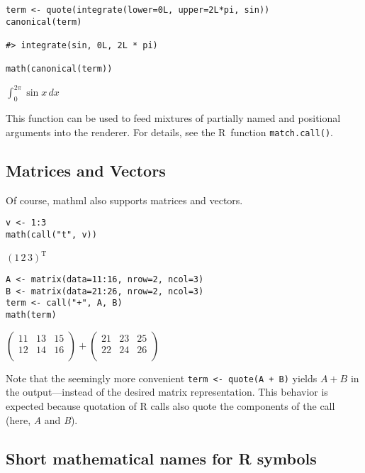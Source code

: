\begin{verbatim}
term <- quote(integrate(lower=0L, upper=2L*pi, sin))
canonical(term)

#> integrate(sin, 0L, 2L * pi)

math(canonical(term))
\end{verbatim}

\(\int_{0}^{{2}{{}}{\pi}}{\sin{x}}\,{d{x}}\)

This function can be used to feed mixtures of partially named and
positional arguments into the renderer. For details, see the R~function
\texttt{match.call()}.

\hypertarget{matrices-and-vectors}{%
\subsection{Matrices and Vectors}\label{matrices-and-vectors}}

Of course, mathml also supports matrices and vectors.

\begin{verbatim}
v <- 1:3
math(call("t", v))
\end{verbatim}

\({\left({1}{{\,}{2}{{\,}{3}}}\right)}^{\mathrm{T}}\)

\begin{verbatim}
A <- matrix(data=11:16, nrow=2, ncol=3)
B <- matrix(data=21:26, nrow=2, ncol=3)
term <- call("+", A, B)
math(term)
\end{verbatim}

\({\left(\begin{array}{ccc}11 & 13 & 15\\ 12 & 14 & 16\\ \end{array}\right)}{+}{\left(\begin{array}{ccc}21 & 23 & 25\\ 22 & 24 & 26\\ \end{array}\right)}\)

Note that the seemingly more convenient \texttt{term~\textless{}-~quote(A~+~B)} yields
\(A + B\) in the output---instead of the desired matrix representation.
This behavior is expected because quotation of R calls also quote the
components of the call (here, \emph{A} and \emph{B}).

\hypertarget{short-mathematical-names-for-r-symbols}{%
\subsection{Short mathematical names for R symbols}\label{short-mathematical-names-for-r-symbols}}

